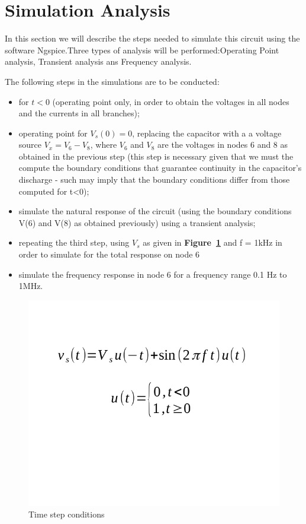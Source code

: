 \section{Simulation Analysis}
\label{sec:simulation}
In this section we will describe the steps needed to simulate this circuit using the software Ngspice.Three types of analysis will be performed:Operating Point analysis, Transient analysis ans Frequency analysis.

The following steps in the simulations are to be conducted: 
\begin{itemize}
	\item for $t<0$ (operating point only, in order to obtain the voltages in all nodes and the currents in all branches);
	\item operating point for  $V_s(0) = 0$, replacing the capacitor with a a voltage source $V_x = V_6-V_8$, where $V_6$ and $V_8$ are the voltages in nodes 6 and 8 as obtained in the previous step (this step is necessary given that we must the compute the boundary conditions that guarantee continuity in the capacitor's discharge - such may imply that the boundary conditions differ from those computed for t<0);
	\item simulate the natural response of the circuit (using the boundary conditions V(6) and V(8) as obtained previously) using a transient analysis;
	\item repeating the third step, using {\it $V_s$} as given in \textbf{Figure~\ref{fig:time_step}} and f = 1kHz  in order to simulate for the total response on node 6
	\item simulate the frequency response in node 6 for a frequency range 0.1 Hz to 1MHz.
\end{itemize}
 
 \begin{figure}[H] \centering
\includegraphics[width=0.5\linewidth]{time_step.pdf}
\caption{Time step conditions}
\label{fig:time_step}
\end{figure}

